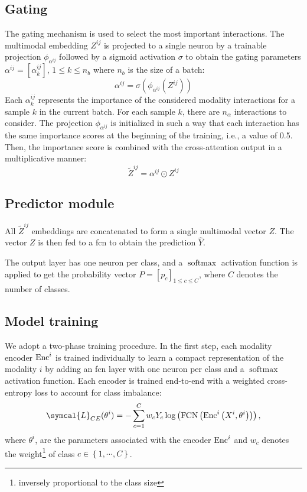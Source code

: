\documentclass[../main.tex]{subfiles}
\begin{document}
	\subsection{Gating}
		The gating mechanism is used to select the most important interactions.
		The multimodal embedding \(Z^{ij}\) is projected to a single neuron by a trainable projection \(\phi_{\alpha^{ij}}\) followed by a sigmoid activation \(\sigma\) to obtain the gating parameters \(\alpha^{ij} = \left[\alpha^{ij}_{k}\right]\), \(1 \leq k \leq n_b\) where \(n_b\) is the size of a batch:
		\begin{equation}
			\alpha^{ij} = \sigma \left( \phi_{\alpha^{ij}}\left( Z^{ij} \right)\right)
			\label{eq:gate_alpha}
		\end{equation}
		Each \(\alpha^{ij}_{k}\) represents the importance of the considered modality interactions for a sample \(k\) in the current batch.
		For each sample \(k\), there are \(n_{\alpha}\) interactions to consider.
		The projection \(\phi_{\alpha^{ij}}\) is initialized in such a way that each interaction has the same importance scores at the beginning of the training, i.e., a value of 0.5.
		Then, the importance score is combined with the cross-attention output in a multiplicative manner:
		\[ \tilde{Z}^{ij} = \alpha^{ij} \odot Z^{ij} \]

	\subsection{Predictor module}

		All \(\tilde{Z}^{ij}\) embeddings are concatenated to form a single multimodal vector \(Z\).
		The vector \(Z\) is then fed to a \gls{fcn} to obtain the prediction \(\hat{Y}\).

		The output layer has one neuron per class, and a \(\operatorname{softmax}\) activation function is applied to get the probability vector \({P = \left[p_c\right]_{1\leq c\leq C}}\), where \(C\) denotes the number of classes.

	\subsection{Model training}
		We adopt a two-phase training procedure.
		In the first step, each modality encoder \(\operatorname{Enc}^i\) is trained individually to learn a compact representation of the modality \(i\) by adding an \gls{fcn} layer with one neuron per class and a \(\operatorname{softmax}\) activation function.
		Each encoder is trained end-to-end with a weighted cross-entropy loss to account for class imbalance:
		\begin{equation*}
			\symcal{L}_{CE}(\theta^{i}) = - \sum_{c=1}^{C}w_c Y_c \log\left( \fcn\left(\enc^{i}\left(X^{i}, \theta^{i}\right)\right)\right) \text{,}
		\end{equation*}
		where \( \theta^{i}\), are the parameters associated with the encoder \(\operatorname{Enc}^{i}\) and \(w_c\) denotes the weight\footnote{inversely proportional to the class size} of class \(c \in \left\{1, \cdots,C \right\}\).
\end{document}
